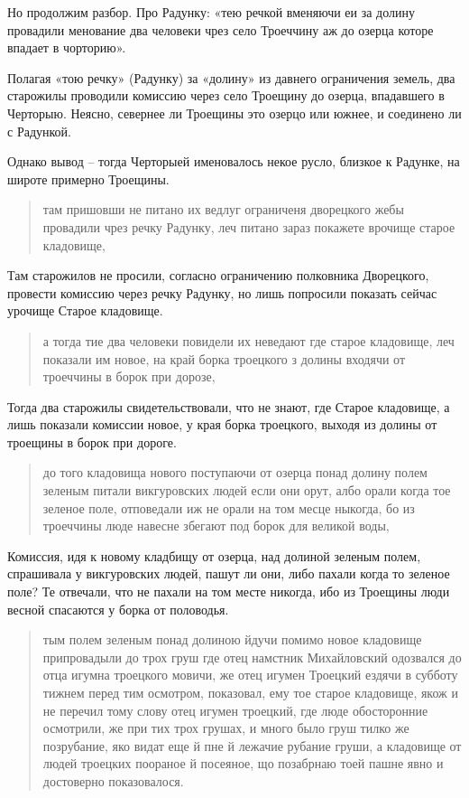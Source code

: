 Но продолжим разбор. Про Радунку: «тею речкой вменяючи еи за долину провадили менование два человеки чрез село Троеччину аж до озерца которе впадает в чорторию».


Полагая «тою речку» (Радунку) за «долину» из давнего ограничения земель, два старожилы проводили комиссию через село Троещину до озерца, впадавшего в Черторыю. Неясно, севернее ли Троещины это озерцо или южнее, и соединено ли с Радункой.

Однако вывод – тогда Черторыей именовалось некое русло, близкое к Радунке, на широте примерно Троещины.

\begin{quotation}
там пришовши не питано их ведлуг ограниченя дворецкого жебы провадили чрез речку Радунку, леч питано зараз покажете врочище старое кладовище,
\end{quotation}

Там старожилов не просили, согласно ограничению полковника Дворецкого, провести комиссию через речку Радунку, но лишь попросили показать сейчас урочище Старое кладовище.

\begin{quotation}
а тогда тие два человеки повидели их неведают где старое кладовище, леч показали им новое, на край борка троецкого з долины входячи от троеччины в борок при дорозе, 
\end{quotation}

Тогда два старожилы свидетельствовали, что не знают, где Старое кладовище, а лишь показали комиссии новое, у края борка троецкого, выходя из долины от троещины в борок при дороге.

\begin{quotation}
до того кладовища нового поступаючи от озерца понад долину полем зеленым питали викгуровских людей если они орут, албо орали когда тое зеленое поле, отповедали иж не орали на том месце ныкогда, бо из троеччины люде навесне збегают под борок для великой воды, 
\end{quotation}

Комиссия, идя к новому кладбищу от озерца, над долиной зеленым полем, спрашивала у викгуровских людей, пашут ли они, либо пахали когда то зеленое поле? Те отвечали, что не пахали на том месте никогда, ибо из Троещины люди весной спасаются у борка от половодья.

\begin{quotation}
тым полем зеленым понад долиною йдучи помимо новое кладовище припровадыли до трох груш где отец намстник Михайловский одозвался до отца игумна троецкого мовичи, же отец игумен Троецкий ездячи в субботу тижнем перед тим осмотром, показовал, ему тое старое кладовище, якож и не перечил тому слову отец игумен троецкий, где люде обосторонние осмотрили, же при тих трох грушах, и много было груш тилко же позрубание, яко видат еще й пне й лежачие рубание груши, а кладовище от людей троецких поораное й посеяное, що позабрнаю тоей пашне явно и достоверно показовалося.
\end{quotation}

